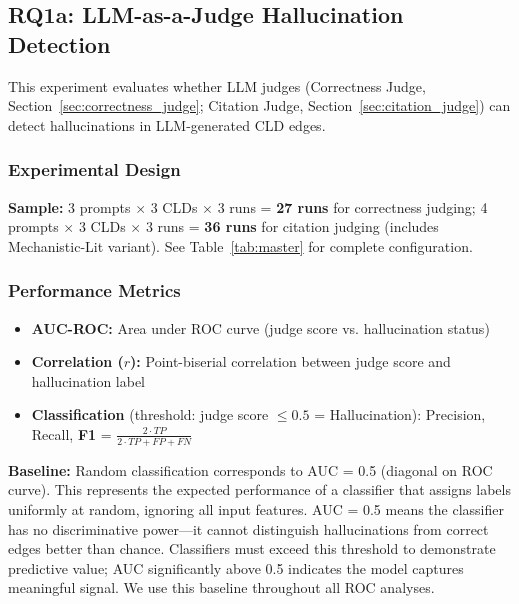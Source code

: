 \subsection{RQ1a: LLM-as-a-Judge Hallucination Detection}

This experiment evaluates whether LLM judges (Correctness Judge, Section~\ref{sec:correctness_judge}; Citation Judge, Section~\ref{sec:citation_judge}) can detect hallucinations in LLM-generated CLD edges.

\subsubsection{Experimental Design}
\textbf{Sample:} 3 prompts $\times$ 3 CLDs $\times$ 3 runs = \textbf{27 runs} for correctness judging; 4 prompts $\times$ 3 CLDs $\times$ 3 runs = \textbf{36 runs} for citation judging (includes Mechanistic-Lit variant). See Table~\ref{tab:master} for complete configuration.

\subsubsection{Performance Metrics}
\begin{itemize}[noitemsep]
    \item \textbf{AUC-ROC:} Area under ROC curve (judge score vs. hallucination status)
    \item \textbf{Correlation ($r$):} Point-biserial correlation between judge score and hallucination label
    \item \textbf{Classification} (threshold: judge score $\leq 0.5$ = Hallucination): Precision, Recall, \textbf{F1} = $\frac{2 \cdot TP}{2 \cdot TP + FP + FN}$
\end{itemize}

\textbf{Baseline:} Random classification corresponds to AUC = 0.5 (diagonal on ROC curve). This represents the expected performance of a classifier that assigns labels uniformly at random, ignoring all input features. AUC = 0.5 means the classifier has no discriminative power---it cannot distinguish hallucinations from correct edges better than chance. Classifiers must exceed this threshold to demonstrate predictive value; AUC significantly above 0.5 indicates the model captures meaningful signal. We use this baseline throughout all ROC analyses.

